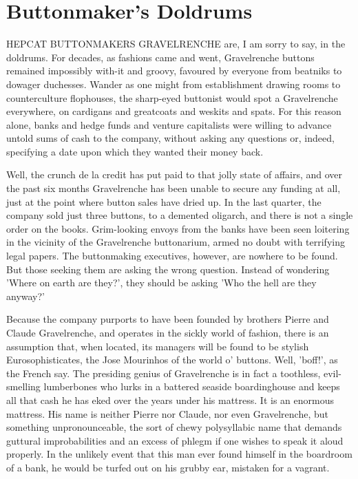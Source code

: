 \chapter{Buttonmaker's Doldrums}

HEPCAT BUTTONMAKERS GRAVELRENCHE are, I am sorry to say, in the doldrums. For decades, as fashions came and went, Gravelrenche buttons remained impossibly with-it and groovy, favoured by everyone from beatniks to dowager duchesses. Wander as one might from establishment drawing rooms to counterculture flophouses, the sharp-eyed buttonist would spot a Gravelrenche everywhere, on cardigans and greatcoats and weskits and spats. For this reason alone, banks and hedge funds and venture capitalists were willing to advance untold sums of cash to the company, without asking any questions or, indeed, specifying a date upon which they wanted their money back.

Well, the crunch de la credit has put paid to that jolly state of affairs, and over the past six months Gravelrenche has been unable to secure any funding at all, just at the point where button sales have dried up. In the last quarter, the company sold just three buttons, to a demented oligarch, and there is not a single order on the books. Grim-looking envoys from the banks have been seen loitering in the vicinity of the Gravelrenche buttonarium, armed no doubt with terrifying legal papers. The buttonmaking executives, however, are nowhere to be found. But those seeking them are asking the wrong question. Instead of wondering 'Where on earth are they?', they should be asking 'Who the hell are they anyway?'

Because the company purports to have been founded by brothers Pierre and Claude Gravelrenche, and operates in the sickly world of fashion, there is an assumption that, when located, its managers will be found to be stylish Eurosophisticates, the Jose Mourinhos of the world o' buttons. Well, 'boff!', as the French say. The presiding genius of Gravelrenche is in fact a toothless, evil-smelling lumberbones who lurks in a battered seaside boardinghouse and keeps all that cash he has eked over the years under his mattress. It is an enormous mattress. His name is neither Pierre nor Claude, nor even Gravelrenche, but something unpronounceable, the sort of chewy polysyllabic name that demands guttural improbabilities and an excess of phlegm if one wishes to speak it aloud properly. In the unlikely event that this man ever found himself in the boardroom of a bank, he would be turfed out on his grubby ear, mistaken for a vagrant.

